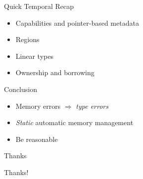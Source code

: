 \documentclass[aspectratio=169]{beamer}
\begin{document}
\begin{frame}{Quick Temporal Recap}
    \begin{itemize}
      \item Capabilities and pointer-based metadata 
      \item Regions 
      \item Linear types 
      \item Ownership and borrowing 
    \end{itemize}
\end{frame}

\begin{frame}{Conclusion}
    \begin{itemize}[<+->]
        \item Memory errors $\Rightarrow$ \emph{type errors}
        \item \emph{Static} automatic memory management %
        \item Be reasonable  %
    \end{itemize}
\end{frame}

\begin{frame}{Thanks}
    \begin{center}
        \Huge{Thanks!}
    \end{center}
\end{frame}

\end{document}
